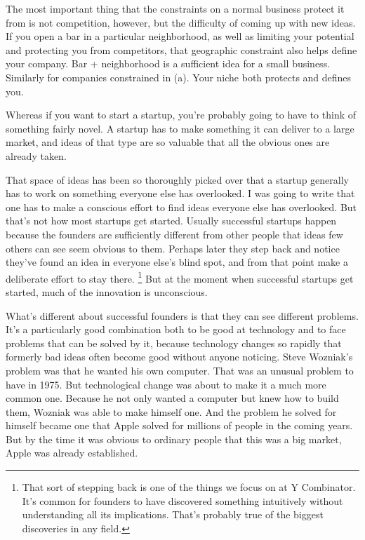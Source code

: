The most important thing that the constraints on a normal business
protect it from is not competition, however, but the difficulty of
coming up with new ideas. If you open a bar in a particular
neighborhood, as well as limiting your potential and protecting you from
competitors, that geographic constraint also helps define your company.
Bar + neighborhood is a sufficient idea for a small business. Similarly
for companies constrained in (a). Your niche both protects and defines
you.

Whereas if you want to start a startup, you're probably going to have to
think of something fairly novel. A startup has to make something it can
deliver to a large market, and ideas of that type are so valuable that
all the obvious ones are already taken.

That space of ideas has been so thoroughly picked over that a startup
generally has to work on something everyone else has overlooked. I was
going to write that one has to make a conscious effort to find ideas
everyone else has overlooked. But that's not how most startups get
started. Usually successful startups happen because the founders are
sufficiently different from other people that ideas few others can see
seem obvious to them. Perhaps later they step back and notice they've
found an idea in everyone else's blind spot, and from that point make a
deliberate effort to stay there. \footnote{That sort of stepping back is one of the things we focus on at Y
Combinator. It's common for founders to have discovered something
intuitively without understanding all its implications. That's probably
true of the biggest discoveries in any field.} But at the
moment when successful startups get started, much of the innovation is
unconscious.

What's different about successful founders is that they can see
different problems. It's a particularly good combination both to be good
at technology and to face problems that can be solved by it, because
technology changes so rapidly that formerly bad ideas often become good
without anyone noticing. Steve Wozniak's problem was that he wanted his
own computer. That was an unusual problem to have in 1975. But
technological change was about to make it a much more common one.
Because he not only wanted a computer but knew how to build them,
Wozniak was able to make himself one. And the problem he solved for
himself became one that Apple solved for millions of people in the
coming years. But by the time it was obvious to ordinary people that
this was a big market, Apple was already established.

